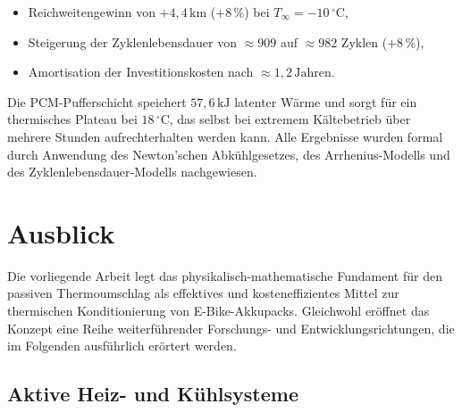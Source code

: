 ﻿\documentclass[a4paper,12pt]{article}
\theoremstyle{definition}
\begin{document}
\begin{itemize}
  \item Reichweitengewinn von $+4{,}4\,\mathrm{km}$ ($+8\,\%$) bei $T_\infty = -10\,{}^\circ\mathrm{C}$,
  \item Steigerung der Zyklenlebensdauer von $\approx 909$ auf $\approx 982$ Zyklen ($+8\,\%$),
  \item Amortisation der Investitionskosten nach $\approx 1{,}2\,\mathrm{Jahren}$.
\end{itemize}

Die PCM-Pufferschicht speichert $57{,}6\,\mathrm{kJ}$ latenter W\"arme und sorgt f\"ur ein thermisches Plateau bei $18\,{}^\circ\mathrm{C}$, das selbst bei extremem Kältebetrieb \"uber mehrere Stunden aufrechterhalten werden kann. Alle Ergebnisse wurden formal durch Anwendung des Newton'schen Abk\"uhlgesetzes, des Arrhenius-Modells und des Zyklenlebensdauer-Modells nachgewiesen.

\section{Ausblick}

Die vorliegende Arbeit legt das physikalisch-mathematische Fundament f\"ur den passiven Thermoumschlag als effektives und kosteneffizientes Mittel zur thermischen Konditionierung von E-Bike-Akkupacks. Gleichwohl er\"offnet das Konzept eine Reihe weiterf\"uhrender Forschungs- und Entwicklungsrichtungen, die im Folgenden ausf\"uhrlich er\"ortert werden.

\subsection{Aktive Heiz- und K\"uhlsysteme}
\end{document}
